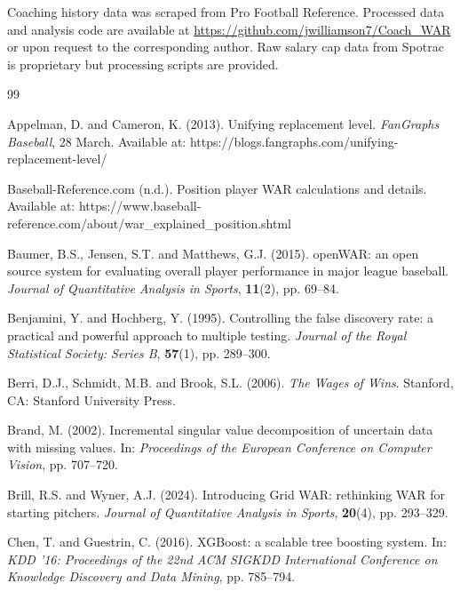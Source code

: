 \documentclass[USenglish]{article}
\theoremstyle{dgthm}
\theoremstyle{dgdef}
\begin{document}
Coaching history data was scraped from Pro Football Reference. Processed data and analysis code are available at \url{https://github.com/jwilliamson7/Coach_WAR} or upon request to the corresponding author. Raw salary cap data from Spotrac is proprietary but processing scripts are provided.

\begin{thebibliography}{99}

Appelman, D. and Cameron, K. (2013). Unifying replacement level. \emph{FanGraphs Baseball}, 28 March. Available at: https://blogs.fangraphs.com/unifying-replacement-level/

Baseball-Reference.com (n.d.). Position player WAR calculations and details. Available at: https://www.baseball-reference.com/about/war\_explained\_position.shtml

Baumer, B.S., Jensen, S.T. and Matthews, G.J. (2015). openWAR: an open source system for evaluating overall player performance in major league baseball. \emph{Journal of Quantitative Analysis in Sports}, \textbf{11}(2), pp. 69--84.

Benjamini, Y. and Hochberg, Y. (1995). Controlling the false discovery rate: a practical and powerful approach to multiple testing. \emph{Journal of the Royal Statistical Society: Series B}, \textbf{57}(1), pp. 289--300.

Berri, D.J., Schmidt, M.B. and Brook, S.L. (2006). \emph{The Wages of Wins}. Stanford, CA: Stanford University Press.

Brand, M. (2002). Incremental singular value decomposition of uncertain data with missing values. In: \emph{Proceedings of the European Conference on Computer Vision}, pp. 707--720.

Brill, R.S. and Wyner, A.J. (2024). Introducing Grid WAR: rethinking WAR for starting pitchers. \emph{Journal of Quantitative Analysis in Sports}, \textbf{20}(4), pp. 293--329.

Chen, T. and Guestrin, C. (2016). XGBoost: a scalable tree boosting system. In: \emph{KDD '16: Proceedings of the 22nd ACM SIGKDD International Conference on Knowledge Discovery and Data Mining}, pp. 785--794.


\end{thebibliography}
\end{document}

